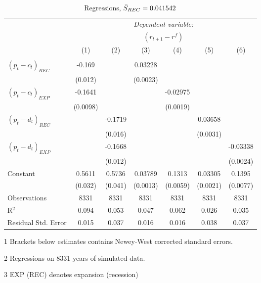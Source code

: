 \begin{table}[H]
\centering   
  \caption{Regressions, $\Bar{S}_{REC} = 0.041542$}           
  \label{tab:regress1}     
  \begin{threeparttable}
\begin{tabular}{@{\hspace{5pt}}l@{\hspace{5pt}}cccccc} 
\toprule 
 & \multicolumn{6}{c}{\textit{Dependent variable:}} \\ 
 & \multicolumn{6}{c}{$\left(r_{t+1}-r^f\right)$} \\ 
 \cmidrule(rr){2-7}
 & (1) & (2) & (3) & (4) & (5) & (6) \\ 
\midrule  
\\[-2.1ex] $\left( p_t - c_t \right)_{REC}$ &-0.169& &0.03228 & & &\\ 
  & (0.012) & &(0.0023) & & & \\ 
 \addlinespace 
  $\left( p_t - c_t \right)_{EXP}$ &-0.1641  &    & &-0.02975 & &  \\ 
  & (0.0098) & & &(0.0019) & & \\ 
 \addlinespace 
  $\left( p_t - d_t \right)_{REC}$ & &-0.1719& & & 0.03658  &   \\ 
                                   & &  (0.016) & & & (0.0031) &    \\ 
 \addlinespace 
  $\left( p_t - d_t \right)_{EXP}$ & &   -0.1668& & & &-0.03338 \\ 
                                   & &  (0.012) & & & &(0.0024) \\ 
 \addlinespace 
 Constant &0.5611 &0.5736&0.03789 &0.1313 &0.03305 &0.1395 \\ 
          &(0.032) &(0.041)&(0.0013)&(0.0059)&(0.0021)&(0.0077) \\ 
 \addlinespace 
\midrule  
Observations & 8331 & 8331&8331 & 8331&8331&8331\\
R$^{2}$ &0.094 & 0.053&0.047&0.062&0.026&0.035 \\ 
Residual Std. Error &0.015 & 0.037&0.016&0.016&0.038&0.037 \\ 
\bottomrule 
\end{tabular} 
\begin{tablenotes}
\footnotesize{
\item[1] Brackets below estimates contains Newey-West corrected standard errors. 
\item[2] Regressions on 8331 years of simulated data.
\item[3] EXP (REC) denotes expansion (recession)
}
\end{tablenotes}
\end{threeparttable}
\end{table} 
